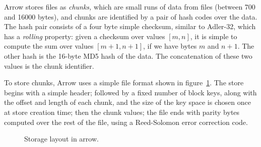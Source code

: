 \documentclass{article}
\begin{document}
Arrow stores files as \emph{chunks,} which are small runs of data from
files (between 700 and 16000 bytes), and chunks are identified by a
pair of hash codes over the data. The hash pair consists of a four
byte simple checksum, similar to Adler-32, which has a \emph{rolling}
property: given a checksum over values \( [m,n] \), it is simple to
compute the sum over values \( [m+1,n+1] \), if we have bytes \( m \)
and \( n+1 \). The other hash is the 16-byte MD5 hash of the data. The
concatenation of these two values is the chunk identifier.

To store chunks, Arrow uses a simple file format shown in
figure~\ref{fig:store-layout}. The store begins with a simple header;
followed by a fixed number of block keys, along with the offset and
length of each chunk, and the size of the key space is chosen once at
store creation time; then the chunk values; the file ends with parity
bytes computed over the rest of the file, using a Reed-Solomon error
correction code.

\begin{figure}[ht!]
  \begin{center}
    \caption{Storage layout in arrow.}
    \label{fig:store-layout}
  \end{center}
\end{figure}
\end{document}
